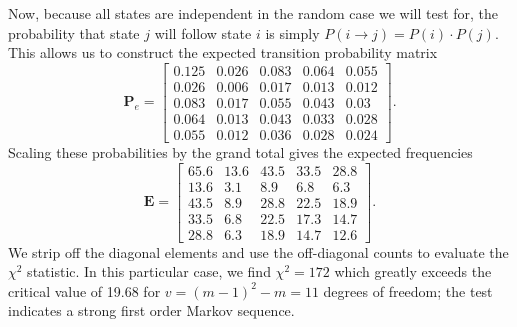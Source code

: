 \begin{example}
	Now, because all states are independent in the random case we will test for, the probability 
that state $j$ will follow state $i$ is simply $P(i \rightarrow j) = P(i) \cdot P(j)$.  This allows us to construct the 
expected transition probability matrix
\begin{equation}
\mathbf{P}_e = \left [ \begin{array}{ccccc}
0.125 & 0.026 & 0.083 & 0.064 & 0.055 \\
0.026 & 0.006 & 0.017 & 0.013 & 0.012\\
0.083 & 0.017 & 0.055 & 0.043 & 0.03 \\
0.064 & 0.013 & 0.043 & 0.033 & 0.028 \\
0.055 & 0.012 & 0.036 & 0.028 & 0.024
\end{array} \right ].
\end{equation}
Scaling these probabilities by the grand total gives the expected frequencies
\begin{equation}
\mathbf{E} = \left [ \begin{array}{ccccc}
65.6  & 13.6 & 43.5 & 33.5  & 28.8  \\
13.6  & 3.1   & 8.9   & 6.8   & 6.3  \\
43.5  & 8.9   & 28.8 & 22.5  & 18.9 \\
33.5 & 6.8   & 22.5  &17.3   & 14.7  \\
28.8  & 6.3  & 18.9  & 14.7 &  12.6 
\end{array} \right ].
\end{equation}
We strip off the diagonal elements and use the off-diagonal counts to evaluate the $\chi^2$ statistic.  
In this particular case, we find $\chi^2 = 172$ which greatly exceeds the critical value of 19.68 for $v = (m-1)^2 - 
m = 11$ degrees of freedom; the test indicates a strong first order Markov sequence.
\end{example}


